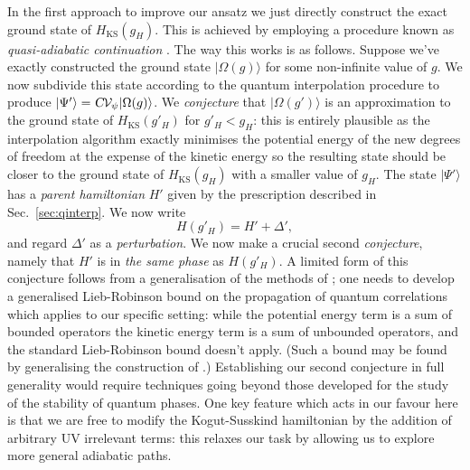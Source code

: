 \documentclass[twocolumn,lengthcheck,superscriptaddress]{revtex4-1}
\theoremstyle{definition}
\theoremstyle{remark}
\begin{document}

In the first approach to improve our ansatz we just directly construct the exact ground state of $H_{\text{KS}}(g_H)$. This is achieved by employing a procedure known as \emph{quasi-adiabatic continuation} \cite{hastings:2005a, osborne:2006a}. The way this works is as follows. Suppose we've exactly constructed the ground state $|\Omega(g)\rangle$ for some non-infinite value of $g$. We now subdivide this state according to the quantum interpolation procedure to produce $|\Psi'\rangle = \textsl{C}\mathcal{V}_{\psi}|\Omega(g)\rangle$. We \emph{conjecture} that $|\Omega(g')\rangle$ is an approximation to the ground state of $H_{\text{KS}}(g'_H)$ for $g'_H < g_H$: this is entirely plausible as the interpolation algorithm exactly minimises the potential energy of the new degrees of freedom at the expense of the kinetic energy so the resulting state should be closer to the ground state of $H_{\text{KS}}(g_H)$ with a smaller value of $g_H$. The state $|\Psi'\rangle$ has a \emph{parent hamiltonian} $H'$ given by the prescription described in Sec.~\ref{sec:qinterp}. We now write 
\begin{equation}
	H(g'_H) = H' + \Delta',
\end{equation}
and regard $\Delta'$ as a \emph{perturbation}. We now make a crucial second \emph{conjecture}, namely that $H'$ is in \emph{the same phase} as $H(g'_H)$. A limited form of this conjecture follows from a generalisation of the methods of \cite{bravyi:2010b, bravyi:2010c, michalakis:2013a}; one needs to develop a generalised Lieb-Robinson bound \cite{lieb:1972a, hastings:2005b, nachtergaele:2010b} on the propagation of quantum correlations which applies to our specific setting: while the potential energy term is a sum of bounded operators the kinetic energy term is a sum of unbounded operators, and the standard Lieb-Robinson bound doesn't apply. (Such a bound may be found by generalising the construction of \cite{premont-schwarz:2010a}.) Establishing our second conjecture in full generality would require techniques going beyond those developed for the study of the stability of quantum phases. One key feature which acts in our favour here is that we are free to modify the Kogut-Susskind hamiltonian by the addition of arbitrary UV irrelevant terms: this relaxes our task by allowing us to explore more general adiabatic paths.
\end{document}
